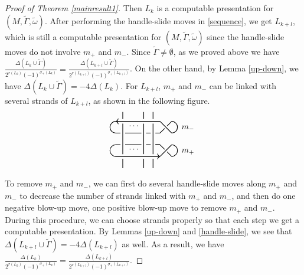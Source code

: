 \documentclass[12pt]{amsart}
\begin{document}
\begin{proof}[Proof of Theorem \ref{mainresult1}]
Then $L_k$ is a computable presentation for $(M, \tilde{\Gamma}, \tilde{\omega})$. After performing the handle-slide moves in \eqref{sequence}, we get $L_{k+l}$, which is still a computable presentation for $(M, \tilde{\Gamma}, \tilde{\omega})$ since the handle-slide moves do not involve $m_+$ and $m_-$. Since $\tilde{\Gamma} \neq \emptyset$, as we proved above we have
$\frac{\Delta (L_k\cup \tilde{\Gamma})}{2^{r(L_k)}(-1)^{\sigma_+(L_k)}}=\frac{\Delta (L_{k+l}\cup \tilde{\Gamma})}{2^{r(L_{k+l})}(-1)^{\sigma_+(L_{k+l})}}$. On the other hand, by Lemma \ref{up-down}, we have $\Delta (L_k\cup \tilde{\Gamma})=-4\Delta (L_k)$. For $L_{k+l}$, $m_+$ and $m_-$ can be linked with several strands of $L_{k+l}$, as shown in the following figure.
\begin{align*}
\begin{tikzpicture}[baseline=-0.65ex, thick, scale=1]
\draw (0,-0.4) to (0,0.9);
\draw (0,-0.6) to (0,-1);
\draw (0,1.1) to (0,1.4);
\draw (-0.4,-0.4) to (-0.4,0.9);
\draw (-0.4,-0.6) to (-0.4,-1);
\draw (-0.4,1.1) to (-0.4,1.4);
\draw (-1.3,-0.4) to (-1.3,0.9);
\draw (-1.3,-0.6) to (-1.3,-1);
\draw (-1.3,1.1) to (-1.3,1.4);
\draw (-0.8, 0.8) node {$\cdots$};
\draw (-0.8, -0.2) node {$\cdots$};
\draw (-1.6,1) [<-]to (0.3,1);
\draw (-1.6,0.5) to (-1.4,0.5);
\draw (-1.2,0.5) to (-0.5,0.5);
\draw (-0.3,0.5) to (-0.1,0.5);
\draw (0.1,0.5) to (0.3,0.5);
\draw  (-1.6,1) arc (90:270:0.25);
\draw (0.3,1) to (0.8,0.5);
\draw (0.3,0.5) to (0.5,0.7);
\draw (0.8,1) to (0.6,0.8);
\draw (-1.6,-0.5) [->]to (0.3,-0.5);
\draw (-1.6,0) to (-1.4,0);
\draw (-1.2,0) to (-0.5,0);
\draw (-0.3,0) to (-0.1,0);
\draw (0.1,0) to (0.3,0);
\draw (0.1,0) to (0.3,0);
\draw  (-1.6,0) arc (90:270:0.25);
\draw (0.3,0) to (0.5,-0.2);
\draw (0.6,-0.3) to (0.8,-0.5);
\draw (0.3,-0.5) to (0.8,0);
\draw (0.8,-0.5) arc (-90:90:0.25);
\draw (0.8,0.5) arc (-90:90:0.25);
\draw (1.5, -0.3) node {$m_{+}$};
\draw (1.5, 0.7) node {$m_{-}$};
\end{tikzpicture}
\end{align*}

To remove $m_+$ and $m_-$, we can first do several handle-slide moves along $m_+$ and $m_-$ to decrease the number of strands linked with $m_+$ and $m_-$, and then do one negative blow-up move, one positive blow-up move to remove $m_+$ and $m_-$. During this procedure, we can choose strands properly so that each step we get a computable presentation. By Lemmas \ref{up-down} and \ref{handle-slide}, we see that $\Delta (L_{k+l}\cup \tilde{\Gamma})=-4\Delta (L_{k+l})$ as well. As a result, we have $\frac{\Delta (L_k)}{2^{r(L_k)}(-1)^{\sigma_+(L_k)}}=\frac{\Delta (L_{k+l})}{2^{r(L_{k+l})}(-1)^{\sigma_+(L_{k+l})}}$.
\end{proof}
\end{document}
